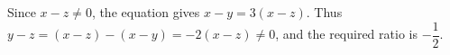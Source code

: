 Since $x-z\ne0$, the equation gives $x-y=3(x-z)$. Thus $y-z=(x-z)-(x-y)=-2(x-z)\ne0$, and the required ratio is $\boxed{-\dfrac{1}{2}}$.
